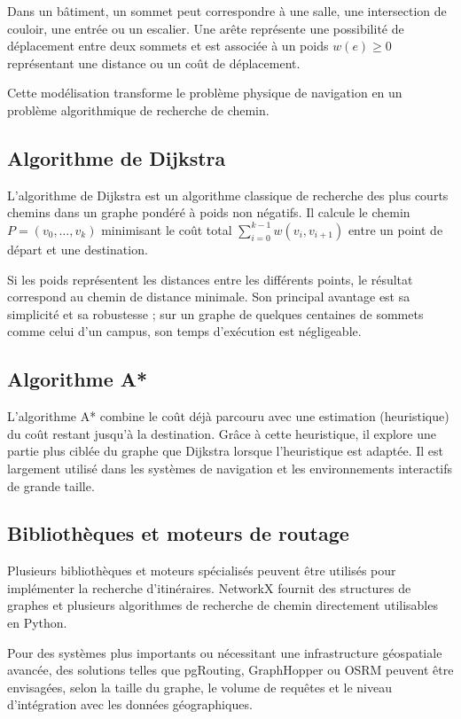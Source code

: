\documentclass[12pt,a4paper]{report}
\begin{document}
Dans un bâtiment, un sommet peut correspondre à une salle, une intersection de couloir, une entrée
ou un escalier. Une arête représente une possibilité de déplacement entre deux sommets et est
associée à un poids $w(e) \geq 0$ représentant une distance ou un coût de déplacement.

Cette modélisation transforme le problème physique de navigation en un problème algorithmique de
recherche de chemin.

\subsection{Algorithme de Dijkstra}

L'algorithme de Dijkstra est un algorithme classique de recherche des plus courts chemins dans un
graphe pondéré à poids non négatifs. Il calcule le chemin $P = (v_0, \ldots, v_k)$ minimisant le
coût total $\sum_{i=0}^{k-1} w(v_i, v_{i+1})$ entre un point de départ et une destination.

Si les poids représentent les distances entre les différents points, le résultat correspond au
chemin de distance minimale. Son principal avantage est sa simplicité et sa robustesse ; sur un
graphe de quelques centaines de sommets comme celui d'un campus, son temps d'exécution est
négligeable.

\subsection{Algorithme A*}

L'algorithme A* combine le coût déjà parcouru avec une estimation (heuristique) du coût restant
jusqu'à la destination. Grâce à cette heuristique, il explore une partie plus ciblée du graphe que
Dijkstra lorsque l'heuristique est adaptée. Il est largement utilisé dans les systèmes de
navigation et les environnements interactifs de grande taille.

\subsection{Bibliothèques et moteurs de routage}

Plusieurs bibliothèques et moteurs spécialisés peuvent être utilisés pour implémenter la recherche
d'itinéraires. NetworkX fournit des structures de graphes et plusieurs algorithmes de recherche de
chemin directement utilisables en Python.

Pour des systèmes plus importants ou nécessitant une infrastructure géospatiale avancée, des
solutions telles que pgRouting, GraphHopper ou OSRM peuvent être envisagées, selon la taille du
graphe, le volume de requêtes et le niveau d'intégration avec les données géographiques.
\end{document}
